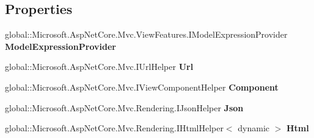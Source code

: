 \subsection*{Properties}
\begin{DoxyCompactItemize}
\item 
\mbox{\label{class_projeto_e_s_w_1_1_areas_1_1_identity_1_1_pages_1_1_areas___identity___pages_____view_start_a9c8a02bd555d4514e431df68e7a8fd04}} 
global\+::\+Microsoft.\+Asp\+Net\+Core.\+Mvc.\+View\+Features.\+I\+Model\+Expression\+Provider {\bfseries Model\+Expression\+Provider}
\item 
\mbox{\label{class_projeto_e_s_w_1_1_areas_1_1_identity_1_1_pages_1_1_areas___identity___pages_____view_start_af2a090914983a23962e3785c7426fe51}} 
global\+::\+Microsoft.\+Asp\+Net\+Core.\+Mvc.\+I\+Url\+Helper {\bfseries Url}
\item 
\mbox{\label{class_projeto_e_s_w_1_1_areas_1_1_identity_1_1_pages_1_1_areas___identity___pages_____view_start_a63f366d9f82b2fb78798d98005998134}} 
global\+::\+Microsoft.\+Asp\+Net\+Core.\+Mvc.\+I\+View\+Component\+Helper {\bfseries Component}
\item 
\mbox{\label{class_projeto_e_s_w_1_1_areas_1_1_identity_1_1_pages_1_1_areas___identity___pages_____view_start_ad56555b6acecdbd6cd34f36b339c7362}} 
global\+::\+Microsoft.\+Asp\+Net\+Core.\+Mvc.\+Rendering.\+I\+Json\+Helper {\bfseries Json}
\item 
\mbox{\label{class_projeto_e_s_w_1_1_areas_1_1_identity_1_1_pages_1_1_areas___identity___pages_____view_start_ae4d0f7d8e0dd571e9464dca5f9891997}} 
global\+::\+Microsoft.\+Asp\+Net\+Core.\+Mvc.\+Rendering.\+I\+Html\+Helper$<$ dynamic $>$ {\bfseries Html}
\end{DoxyCompactItemize}


